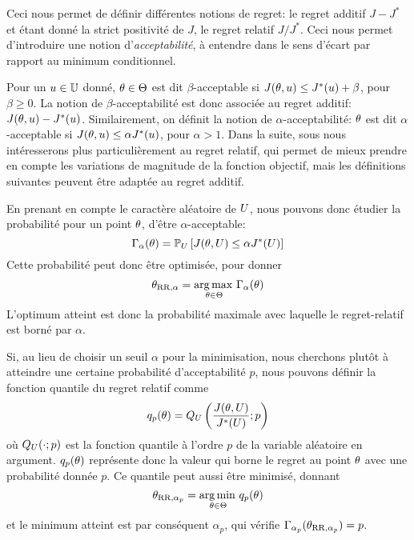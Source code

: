 \documentclass[../../Main_ManuscritThese.tex]{subfiles}
\begin{document}
Ceci nous permet de définir différentes notions de regret: le regret
additif $J - J^*$ et étant donné la strict positivité de $J$, le
regret relatif $J/J^*$. Ceci nous permet d'introduire une notion
d'\emph{acceptabilité}, à entendre dans le sens d'écart par rapport au
minimum conditionnel.

Pour un $u\in\mathbb{U}$ donné, $\theta\in\Theta$ est dit
$\beta$-acceptable si $J(\theta, u) \leq J^*(u) + \beta$, pour
$\beta \geq 0$. La notion de $\beta$-acceptabilité est donc associée
au regret additif: $J(\theta, u) - J^*(u)$.  Similairement, on
définit la notion de $\alpha$-acceptabilité: $\theta$ est dit
$\alpha$-acceptable si $J(\theta, u) \leq \alpha J^*(u)$, pour
$\alpha > 1$. Dans la suite, sous nous intéresserons plus
particulièrement au regret relatif, qui permet de mieux prendre en
compte les variations de magnitude de la fonction objectif, mais les
définitions suivantes peuvent être adaptée au regret additif.


En prenant en compte le caractère aléatoire de $U$, nous pouvons
donc étudier la probabilité pour un point $\theta$, d'être $\alpha$-acceptable:
\begin{equation*}
\Gamma_{\alpha}(\theta) = \mathbb{P}_{U}\left[J(\theta,U) \leq \alpha J^*(U) \right]
\end{equation*}
Cette probabilité peut donc être optimisée, pour donner
\begin{equation*}
  \theta_{\mathrm{RR},\alpha} = \operatorname*{arg\,max \,}_{\theta \in\Theta} \Gamma_\alpha(\theta)
\end{equation*}
L'optimum atteint est donc la probabilité maximale avec laquelle le
regret-relatif est borné par $\alpha$.


Si, au lieu de choisir un seuil $\alpha$ pour la minimisation, nous
cherchons plutôt à atteindre une certaine probabilité d'acceptabilité
$p$, nous pouvons définir la fonction quantile du regret relatif comme
\begin{equation*}
  q_p(\theta) = Q_{U}\left(\frac{J(\theta,U)}{J^*(U)};p\right)
\end{equation*}
où $Q_{U}(\cdot;p)$ est la fonction quantile à l'ordre $p$ de la
variable aléatoire en argument. $q_p(\theta)$ représente donc la valeur qui
borne le regret au point $\theta$ avec une probabilité donnée $p$.
Ce quantile peut aussi être minimisé, donnant
\begin{equation*}
  \theta_{\mathrm{RR},\alpha_p} = \operatorname*{arg\,min \,}_{\theta \in \Theta} q_p(\theta)
\end{equation*}
et le minimum atteint est par conséquent $\alpha_p$, qui vérifie
$\Gamma_{\alpha_p}(\theta_{\mathrm{RR},\alpha_p}) = p$.
  
\end{document}
